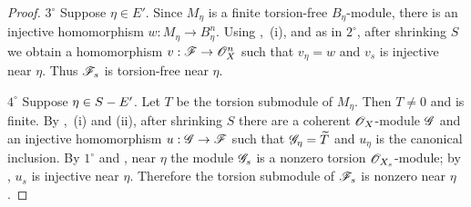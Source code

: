 \begin{proof}
$3^\circ$ Suppose $\eta\in E'$. Since $M_\eta$ is a finite torsion-free $B_\eta$-module, there is an injective homomorphism $w:M_\eta\to B_\eta^n$. Using ,~(i), and  as in $2^\circ$, after shrinking $S$ we obtain a homomorphism $v:\mathscr{F}\to\mathscr{O}_X^n$ such that $v_\eta=w$ and $v_s$ is injective near $\eta$. Thus $\mathscr{F}_s$ is torsion-free near $\eta$.

$4^\circ$ Suppose $\eta\in S- E'$. Let $T$ be the torsion submodule of $M_\eta$. Then $T\neq 0$ and is finite. By ,~(i) and (ii), after shrinking $S$ there are a coherent $\mathscr{O}_X$-module $\mathscr{G}$ and an injective homomorphism $u:\mathscr{G}\to\mathscr{F}$ such that $\mathscr{G}_\eta=\widetilde{T}$ and $u_\eta$ is the canonical inclusion. By $1^\circ$ and , near $\eta$ the module $\mathscr{G}_s$ is a nonzero torsion $\mathscr{O}_{X_s}$-module; by , $u_s$ is injective near $\eta$. Therefore the torsion submodule of $\mathscr{F}_s$ is nonzero near $\eta$.
\end{proof}

